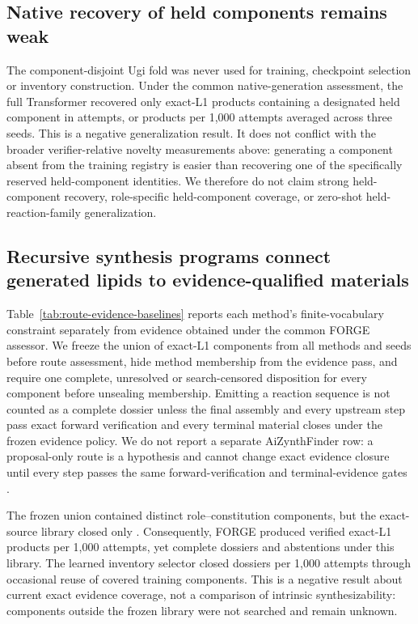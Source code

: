 \documentclass{article}
\begin{document}
\subsection{Native recovery of held components remains weak}

The component-disjoint Ugi fold was never used for training, checkpoint selection or inventory
construction. Under the common native-generation assessment, the full Transformer recovered only
\ForgeProseCommonHeldTotal{} exact-L1 products containing a designated held component in
\ForgeProseCommonHeldAttempts{} attempts, or \ForgeProseCommonForgeHeldPerThousand{} products per 1,000
attempts averaged across three seeds. This is a negative generalization result. It does not conflict
with the broader verifier-relative novelty measurements above: generating a component absent from
the training registry is easier than recovering one of the specifically reserved held-component
identities. We therefore do not claim strong held-component recovery, role-specific held-component
coverage, or zero-shot held-reaction-family generalization.

\subsection{Recursive synthesis programs connect generated lipids to evidence-qualified materials}

Table~\ref{tab:route-evidence-baselines} reports each method's finite-vocabulary constraint
separately from evidence obtained under the common FORGE assessor.
We freeze the union of exact-L1 components from all methods and seeds before route assessment,
hide method membership from the evidence pass, and require one complete, unresolved or
search-censored disposition for every component before unsealing membership.
Emitting a reaction sequence is not counted as a complete dossier unless the final assembly and
every upstream step pass exact forward verification and every terminal material closes under the
frozen evidence policy.
We do not report a separate AiZynthFinder row: a proposal-only route is a hypothesis and cannot
change exact evidence closure until every step passes the same forward-verification and
terminal-evidence gates \citep{genheden2020aizynthfinder}.

\begin{minipage}{\linewidth}
The frozen union contained \ForgeCommonRouteUnionComponents{} distinct role--constitution
components, but the exact-source library closed only
\ForgeCommonRouteEvidenceCompleteComponents{}. Consequently, FORGE produced
\ForgeCommonRouteForgeExactPerThousand{} verified exact-L1 products per 1,000 attempts, yet
\ForgeCommonRouteForgeCompletePerThousand{} complete dossiers and
\ForgeCommonRouteForgeAbstentionPerThousand{} abstentions under this library. The learned inventory
selector closed \ForgeCommonRouteSelectorCompletePerThousand{} dossiers per 1,000 attempts through
occasional reuse of covered training components. This is a negative result about current exact
evidence coverage, not a comparison of intrinsic synthesizability: components outside the frozen
library were not searched and remain unknown.
\end{minipage}
\end{document}

